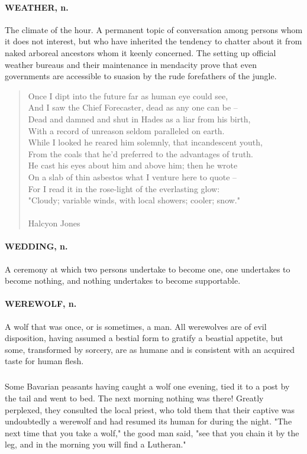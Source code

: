 \documentclass[11pt]{article}
\begin{document}
\paragraph{WEATHER, n.}  The climate of the hour.  A permanent topic of
conversation among persons whom it does not interest, but who have
inherited the tendency to chatter about it from naked arboreal
ancestors whom it keenly concerned.  The setting up official weather
bureaus and their maintenance in mendacity prove that even governments
are accessible to suasion by the rude forefathers of the jungle.

\begin{quote}   Once I dipt into the future far as human eye could see, \\
  And I saw the Chief Forecaster, dead as any one can be -- \\
  Dead and damned and shut in Hades as a liar from his birth, \\
  With a record of unreason seldom paralleled on earth. \\
  While I looked he reared him solemnly, that incandescent youth, \\
  From the coals that he'd preferred to the advantages of truth. \\
  He cast his eyes about him and above him; then he wrote \\
  On a slab of thin asbestos what I venture here to quote -- \\
  For I read it in the rose-light of the everlasting glow: \\
  "Cloudy; variable winds, with local showers; cooler; snow." \\
 \\
Halcyon Jones \end{quote}


\paragraph{WEDDING, n.}  A ceremony at which two persons undertake to become one,
one undertakes to become nothing, and nothing undertakes to become
supportable.

\paragraph{WEREWOLF, n.}  A wolf that was once, or is sometimes, a man.  All
werewolves are of evil disposition, having assumed a bestial form to
gratify a beastial appetite, but some, transformed by sorcery, are as
humane and is consistent with an acquired taste for human flesh.
\subparagraph{}   Some Bavarian peasants having caught a wolf one evening, tied it
to a post by the tail and went to bed.  The next morning nothing was
there!  Greatly perplexed, they consulted the local priest, who told
them that their captive was undoubtedly a werewolf and had resumed its
human for during the night.  "The next time that you take a wolf," the
good man said, "see that you chain it by the leg, and in the morning
you will find a Lutheran."
\end{document}
